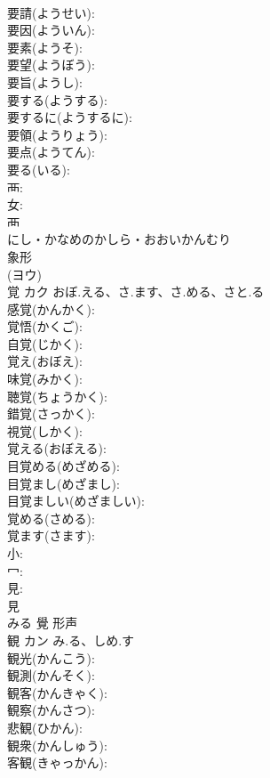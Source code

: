 \documentclass[8pt]{extreport}
\begin{document}
\begin{CJK}{UTF8}{min}
\\	要請(ようせい): 
\\	要因(よういん): 
\\	要素(ようそ): 
\\	要望(ようぼう): 
\\	要旨(ようし): 
\\	要する(ようする): 
\\	要するに(ようするに): 
\\	要領(ようりょう): 
\\	要点(ようてん): 
\\	要る(いる): 
\\	襾: 
\\	女: 
\\	襾	
\\	にし・かなめのかしら・おおいかんむり	
\\	象形 
\\	(ヨウ) 
\\	覚	カク	おぼ.える、さ.ます、さ.める、さと.る		
\\	感覚(かんかく): 
\\	覚悟(かくご): 
\\	自覚(じかく): 
\\	覚え(おぼえ): 
\\	味覚(みかく): 
\\	聴覚(ちょうかく): 
\\	錯覚(さっかく): 
\\	視覚(しかく): 
\\	覚える(おぼえる): 
\\	目覚める(めざめる): 
\\	目覚まし(めざまし): 
\\	目覚ましい(めざましい): 
\\	覚める(さめる): 
\\	覚ます(さます): 
\\	小: 
\\	冖: 
\\	見: 
\\	見	
\\	みる	覺	形声 
\\	観	カン	み.る、しめ.す		
\\	観光(かんこう): 
\\	観測(かんそく): 
\\	観客(かんきゃく): 
\\	観察(かんさつ): 
\\	悲観(ひかん): 
\\	観衆(かんしゅう): 
\\	客観(きゃっかん): 

\end{CJK}
\end{document}
